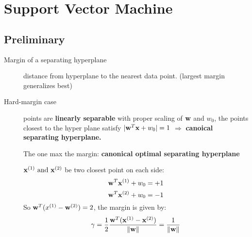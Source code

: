 \chapter{Support Vector Machine}

\section{Preliminary}
\begin{description}
    \item[Margin of a separating hyperplane] distance from hyperplane to
        the nearest data point. (largest margin generalizes best)
    \item[Hard-margin case] points are \textbf{linearly separable}
             with proper scaling of $\mathbf{w}$ and $w_0$, the points closest to
                the hyper plane satisfy $|\mathbf{w}^T\mathbf{x} + w_0|=1$ $\Rightarrow$ \textbf{canoical
                separating hyperplane.}

             The one max the margin: \textbf{canonical optimal separating
                hyperplane}

             $\mathbf{x}^{(1)}\mbox{ and }\mathbf{x}^{(2)}$ be two closest point on each
                side:
                \[ \mathbf{w}^T\mathbf{x}^{(1)} + w_0=+1\]
                \[\mathbf{w}^T\mathbf{x}^{(2)} + w_0 = -1\]
                So $\mathbf{w}^T(x^{(1)}-\mathbf{w}^{(2)}) = 2$, the margin is given by:
                \[\gamma = \frac{1}{2}
                    \frac{\mathbf{w}^T(\mathbf{x}^{(1)}-\mathbf{x}^{(2)})}{\|\mathbf{w}\|} =
                    \frac{1}{\|\mathbf{w}\|}\] 


\end{description}
